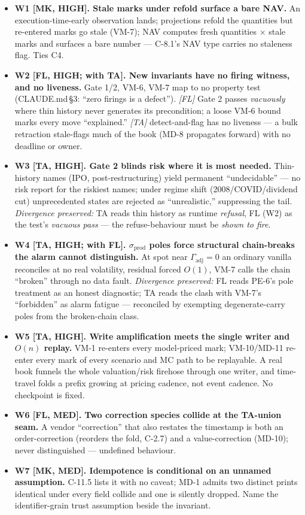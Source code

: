 \documentclass[11pt,a4paper]{article}
\begin{document}
\begin{itemize}\setlength{\itemsep}{0pt}
  \item \textbf{W1 [MK, HIGH]. Stale marks under refold surface a bare NAV.} An execution-time-early
  observation lands; projections refold the quantities but re-entered marks go stale (VM-7); NAV
  computes fresh quantities $\times$ stale marks and surfaces a bare number --- C-8.1's NAV type
  carries no staleness flag. Ties C4.
  \item \textbf{W2 [FL, HIGH; with TA]. New invariants have no firing witness, and no liveness.}
  Gate 1/2, VM-6, VM-7 map to no property test (CLAUDE.md\,\S3: ``zero firings is a defect'').
  \emph{[FL]} Gate 2 passes \emph{vacuously} where thin history never generates its precondition;
  a loose VM-6 bound marks every move ``explained.'' \emph{[TA]} detect-and-flag has no liveness
  --- a bulk retraction stale-flags much of the book (MD-8 propagates forward) with no deadline
  or owner.
  \item \textbf{W3 [TA, HIGH]. Gate 2 blinds risk where it is most needed.} Thin-history names
  (IPO, post-restructuring) yield permanent ``undecidable'' --- no risk report for the riskiest
  names; under regime shift (2008/COVID/dividend cut) unprecedented states are rejected as
  ``unrealistic,'' suppressing the tail. \emph{Divergence preserved:} TA reads thin history as
  runtime \emph{refusal}, FL (W2) as the test's \emph{vacuous pass} --- the refuse-behaviour must
  be \emph{shown to fire}.
  \item \textbf{W4 [TA, HIGH; with FL]. $\sigma_{\mathrm{prod}}$ poles force structural
  chain-breaks the alarm cannot distinguish.} At spot near $\Gamma_{\mathrm{adj}}=0$ an ordinary
  vanilla reconciles at no real volatility, residual forced $O(1)$, VM-7 calls the chain
  ``broken'' through no data fault. \emph{Divergence preserved:} FL reads PE-6's pole treatment
  as an honest diagnostic; TA reads the clash with VM-7's ``forbidden'' as alarm fatigue ---
  reconciled by exempting degenerate-carry poles from the broken-chain class.
  \item \textbf{W5 [TA, HIGH]. Write amplification meets the single writer and $O(n)$ replay.}
  VM-1 re-enters every model-priced mark; VM-10/MD-11 re-enter every mark of every scenario and
  MC path to be replayable. A real book funnels the whole valuation/risk firehose through one
  writer, and time-travel folds a prefix growing at pricing cadence, not event cadence. No
  checkpoint is fixed.
  \item \textbf{W6 [FL, MED]. Two correction species collide at the TA-union seam.} A vendor
  ``correction'' that also restates the timestamp is both an order-correction (reorders the fold,
  C-2.7) and a value-correction (MD-10); never distinguished --- undefined behaviour.
  \item \textbf{W7 [MK, MED]. Idempotence is conditional on an unnamed assumption.} C-11.5 lists
  it with no caveat; MD-1 admits two distinct prints identical under every field collide and one
  is silently dropped. Name the identifier-grain trust assumption beside the invariant.
\end{itemize}
\end{document}
